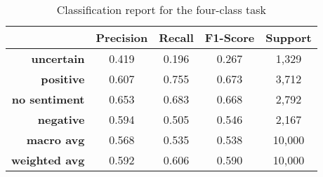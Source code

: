 \begin{table}[!ht]
	\centering
	\begin{tabular}{rcccc}
		\toprule
		  & \textbf{Precision} & \textbf{Recall} & \textbf{F1-Score} & \textbf{Support}\\
		  \midrule
		  	\textbf{uncertain} & 0.419 & 0.196 & 0.267 & 1,329\\
			\textbf{positive} & 0.607 & 0.755 & 0.673 & 3,712\\
			\textbf{no sentiment} & 0.653 & 0.683 & 0.668 & 2,792\\
			\textbf{negative} & 0.594 & 0.505 & 0.546 & 2,167\\
			\midrule
			\textbf{macro avg} & 0.568 & 0.535 & 0.538 & 10,000\\
			\textbf{weighted avg} & 0.592 & 0.606 & 0.590 & 10,000\\		
			\bottomrule
	\end{tabular}
	\caption{Classification report for the four-class task}
	\label{table-classification-report-four-class}
\end{table}